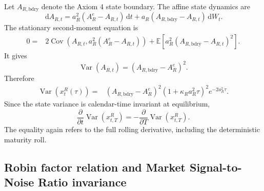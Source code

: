 \documentclass[12pt]{article}
\numberwithin{equation}{subsection}
\newcommand{\E}{\mathbb{E}}
\newcommand{\Var}{\operatorname{Var}}
\newcommand{\Cov}{\operatorname{Cov}}
\newcommand{\dd}{\,\mathrm{d}}
\begin{document}
Let $A_{R,\mathrm{bdry}}$ denote the Axiom 4 state boundary. The affine state dynamics are
\begin{equation}
\dd A_{R,t}
=
a_R^2(A_R^e-A_{R,t})\dd t
+
a_R(A_{R,\mathrm{bdry}}-A_{R,t})\dd W_t.
\end{equation}
The stationary second-moment equation is
\begin{equation}
\begin{aligned}
0
={}&2\Cov\!\left(A_{R,t},a_R^2(A_R^e-A_{R,t})\right)
+
\E\!\left[a_R^2(A_{R,\mathrm{bdry}}-A_{R,t})^2\right].
\end{aligned}
\end{equation}
It gives
\begin{equation}
\Var(A_{R,t})=(A_{R,\mathrm{bdry}}-A_R^e)^2.
\end{equation}
Therefore
\begin{equation}
\begin{aligned}
\Var\!\left(x^R_t(\tau)\right)
={}&(A_{R,\mathrm{bdry}}-A_R^e)^2
\left(1+\kappa_Ra_R^2\tau\right)^2
 e^{-2a_R^2\tau}.
\end{aligned}
\end{equation}
Since the state variance is calendar-time invariant at equilibrium,
\begin{equation}
\frac{\partial}{\partial t}\Var\!\left(x^R_{t,T}\right)
=
-\frac{\partial}{\partial T}\Var\!\left(x^R_{t,T}\right).
\end{equation}
The equality again refers to the full rolling derivative, including the deterministic maturity roll.

\subsection{Robin factor relation and Market Signal-to-Noise Ratio invariance}
\end{document}
